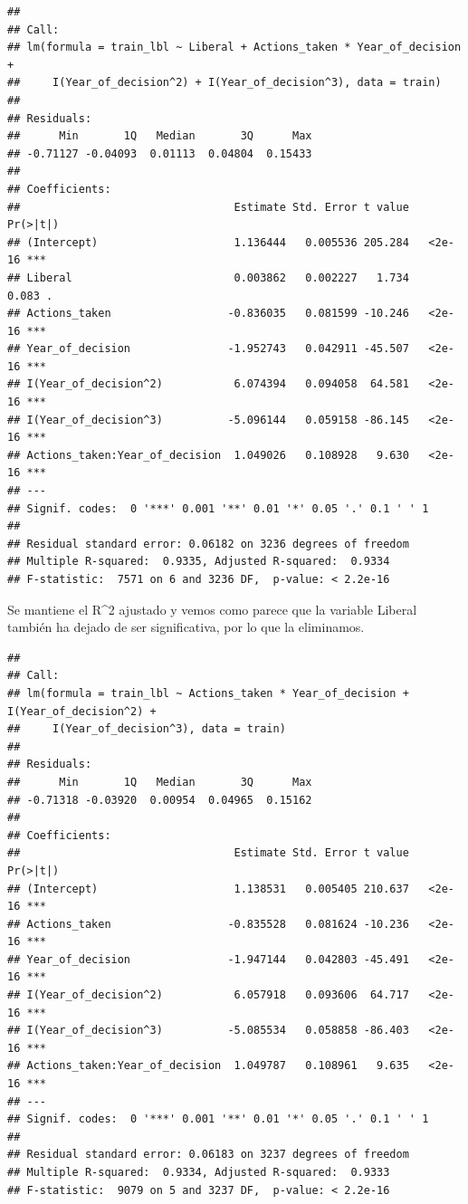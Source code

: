 \documentclass[
]{article}
\begin{document}
\begin{verbatim}
## 
## Call:
## lm(formula = train_lbl ~ Liberal + Actions_taken * Year_of_decision + 
##     I(Year_of_decision^2) + I(Year_of_decision^3), data = train)
## 
## Residuals:
##      Min       1Q   Median       3Q      Max 
## -0.71127 -0.04093  0.01113  0.04804  0.15433 
## 
## Coefficients:
##                                 Estimate Std. Error t value Pr(>|t|)    
## (Intercept)                     1.136444   0.005536 205.284   <2e-16 ***
## Liberal                         0.003862   0.002227   1.734    0.083 .  
## Actions_taken                  -0.836035   0.081599 -10.246   <2e-16 ***
## Year_of_decision               -1.952743   0.042911 -45.507   <2e-16 ***
## I(Year_of_decision^2)           6.074394   0.094058  64.581   <2e-16 ***
## I(Year_of_decision^3)          -5.096144   0.059158 -86.145   <2e-16 ***
## Actions_taken:Year_of_decision  1.049026   0.108928   9.630   <2e-16 ***
## ---
## Signif. codes:  0 '***' 0.001 '**' 0.01 '*' 0.05 '.' 0.1 ' ' 1
## 
## Residual standard error: 0.06182 on 3236 degrees of freedom
## Multiple R-squared:  0.9335, Adjusted R-squared:  0.9334 
## F-statistic:  7571 on 6 and 3236 DF,  p-value: < 2.2e-16
\end{verbatim}

Se mantiene el R\^{}2 ajustado y vemos como parece que la variable
Liberal también ha dejado de ser significativa, por lo que la
eliminamos.

\begin{verbatim}
## 
## Call:
## lm(formula = train_lbl ~ Actions_taken * Year_of_decision + I(Year_of_decision^2) + 
##     I(Year_of_decision^3), data = train)
## 
## Residuals:
##      Min       1Q   Median       3Q      Max 
## -0.71318 -0.03920  0.00954  0.04965  0.15162 
## 
## Coefficients:
##                                 Estimate Std. Error t value Pr(>|t|)    
## (Intercept)                     1.138531   0.005405 210.637   <2e-16 ***
## Actions_taken                  -0.835528   0.081624 -10.236   <2e-16 ***
## Year_of_decision               -1.947144   0.042803 -45.491   <2e-16 ***
## I(Year_of_decision^2)           6.057918   0.093606  64.717   <2e-16 ***
## I(Year_of_decision^3)          -5.085534   0.058858 -86.403   <2e-16 ***
## Actions_taken:Year_of_decision  1.049787   0.108961   9.635   <2e-16 ***
## ---
## Signif. codes:  0 '***' 0.001 '**' 0.01 '*' 0.05 '.' 0.1 ' ' 1
## 
## Residual standard error: 0.06183 on 3237 degrees of freedom
## Multiple R-squared:  0.9334, Adjusted R-squared:  0.9333 
## F-statistic:  9079 on 5 and 3237 DF,  p-value: < 2.2e-16
\end{verbatim}
\end{document}

